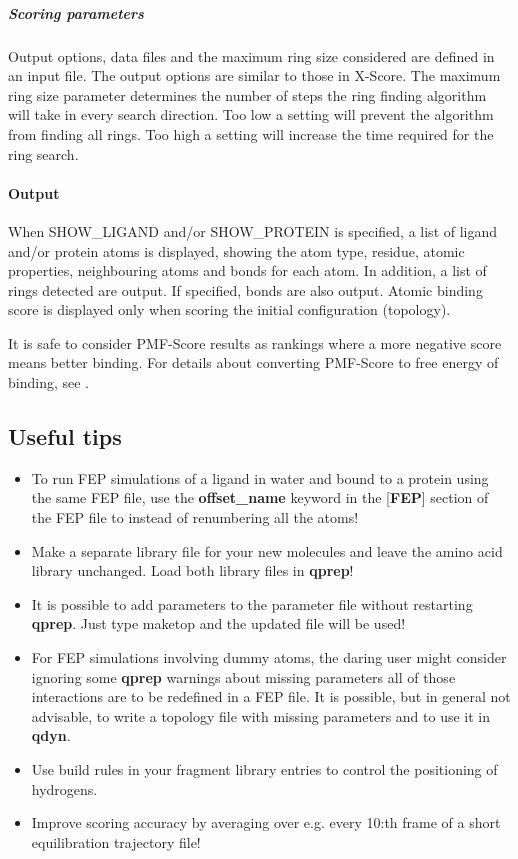 \documentclass[a4paper,10pt]{article}
\begin{document}
  \subparagraph{Scoring parameters}
  Output options, data files and the maximum ring size considered are defined in an input file. The output options are similar to those in X-Score. The maximum ring size parameter determines the number of steps the ring finding algorithm will take in every search direction. Too low a setting will prevent the algorithm from finding all rings. Too high a setting will increase the time required for the ring search.

  \paragraph{Output}
  When SHOW\_LIGAND and/or SHOW\_PROTEIN is specified, a list of ligand and/or protein atoms is displayed, showing the atom type, residue, atomic properties, neighbouring atoms and bonds for each atom. In addition, a list of rings detected are output. If specified, bonds are also output.
  Atomic binding score is displayed only when scoring the initial configuration (topology).

  It is safe to consider PMF-Score results as rankings where a more negative score means better binding. For details about converting PMF-Score to free energy of binding, see \cite{Muegge:1999}.

\subsection{Useful tips}
\begin{itemize}
\item To run FEP simulations of a ligand in water and bound to a
protein using the same FEP file, use the \textbf{offset{\_}name}
keyword in the [\textbf{FEP}] section of the FEP file to instead
of renumbering all the atoms!
\item Make a separate library file for your new molecules
and leave the amino acid library unchanged. Load both library
files in \textbf{qprep}!
\item It is possible to add parameters to the parameter
file without restarting \textbf{qprep}. Just type maketop and the updated
file will be used!
\item For FEP simulations involving dummy
atoms, the daring user might consider ignoring some \textbf{qprep} warnings
about missing parameters all of those interactions are to be
redefined in a FEP file. It is possible, but in general not
advisable, to write a topology file with missing parameters and to
use it in \textbf{qdyn}.
\item Use build rules in your fragment library entries to control the
positioning of hydrogens.
\item Improve scoring accuracy by averaging over e.g. every 10:th frame
of a short equilibration trajectory file!
\end{itemize}
\end{document}
